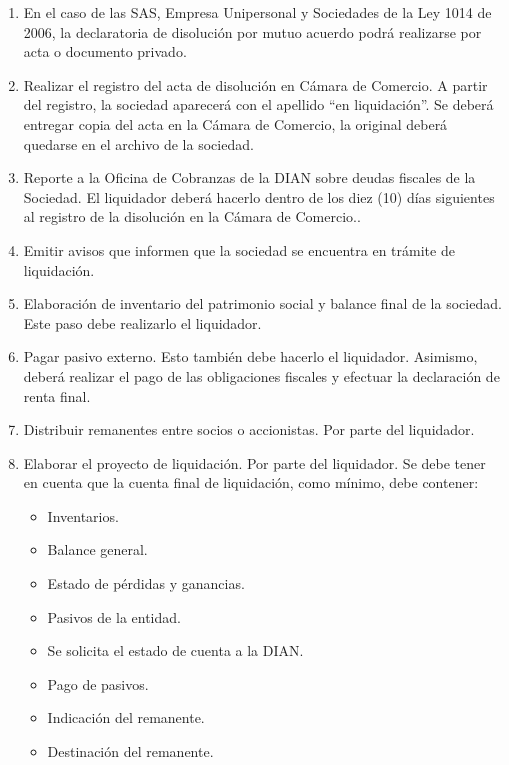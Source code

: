 \begin{enumerate}
    \item En el caso de las SAS, Empresa Unipersonal y Sociedades de la Ley 1014 de 2006, la declaratoria de disolución por mutuo acuerdo podrá realizarse por acta o documento privado.
    
    \item Realizar el registro del acta de disolución en Cámara de Comercio. A partir del registro, la sociedad aparecerá con el apellido “en liquidación”. Se deberá entregar copia del acta en la Cámara de Comercio, la original deberá quedarse en el archivo de la sociedad.
    
    \item Reporte a la Oficina de Cobranzas de la DIAN sobre deudas fiscales de la Sociedad. El liquidador deberá hacerlo dentro de los diez (10) días siguientes al registro de la disolución en la Cámara de Comercio..
    
    \item Emitir avisos que informen que la sociedad se encuentra en trámite de liquidación.
    
    \item Elaboración de inventario del patrimonio social y balance final de la sociedad. Este paso debe realizarlo el liquidador.
    
    \item Pagar pasivo externo. Esto también debe hacerlo el liquidador. Asimismo, deberá realizar el pago de las obligaciones fiscales y efectuar la declaración de renta final.
    
    \item Distribuir remanentes entre socios o accionistas. Por parte del liquidador.
    
    \item Elaborar el proyecto de liquidación. Por parte del liquidador. Se debe tener en cuenta que la cuenta final de liquidación, como mínimo, debe contener:
    
    \begin{itemize}
        \item Inventarios.
        \item Balance general.
        \item Estado de pérdidas y ganancias.
        \item Pasivos de la entidad.
        \item Se solicita el estado de cuenta a la DIAN.
        \item Pago de pasivos.
        \item Indicación del remanente.
        \item Destinación del remanente.
    \end{itemize}
    

\end{enumerate}
